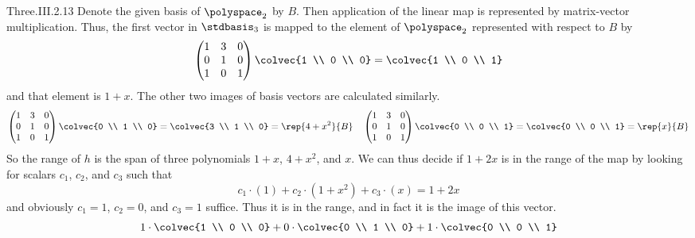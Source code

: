 \begin{ans}{Three.III.2.13}
       Denote the given basis of
       $\polyspace_2$
       by $B$.
       Then application of the linear map is represented by matrix-vector
       multiplication.
       Thus, the first vector in $\stdbasis_3$ is mapped to the element
       of $\polyspace_2$ represented with respect to $B$ by
       \begin{equation*}
       \begin{pmatrix}
         1  &3  &0  \\
         0  &1  &0  \\
         1  &0  &1
       \end{pmatrix}
       \colvec{1 \\ 0 \\ 0}
       =
       \colvec{1 \\ 0 \\ 1}
       \end{equation*}
       and that element is $1+x$.
       The other two images of basis vectors are calculated similarly.
       \begin{equation*}
         \begin{pmatrix}
           1  &3  &0  \\
           0  &1  &0  \\
           1  &0  &1
         \end{pmatrix}
         \colvec{0 \\ 1 \\ 0}
         =
         \colvec{3 \\ 1 \\ 0}=\rep{4+x^2}{B}
         \quad
         \begin{pmatrix}
           1  &3  &0  \\
           0  &1  &0  \\
           1  &0  &1
         \end{pmatrix}
         \colvec{0 \\ 0 \\ 1}
         =
         \colvec{0 \\ 0 \\ 1}=\rep{x}{B}
       \end{equation*}
       So the range of $h$ is the span of three polynomials
       $1+x$, $4+x^2$, and $x$.
       We can thus decide if $1+2x$ is in the range of the map by
       looking for scalars $c_1$, $c_2$, and $c_3$ such that
       \begin{equation*}
         c_1\cdot(1)+c_2\cdot(1+x^2)+c_3\cdot(x)=1+2x
       \end{equation*}
       and obviously $c_1=1$, $c_2=0$, and $c_3=1$ suffice.
       Thus it is in the range, and in fact it is the image of
       this vector.
       \begin{equation*}
         1\cdot\colvec{1 \\ 0 \\ 0}+0\cdot\colvec{0 \\ 1 \\ 0}
             +1\cdot\colvec{0 \\ 0 \\ 1}
       \end{equation*}
     
\end{ans}
